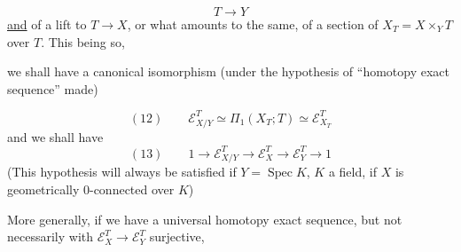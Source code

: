 
\[
T\longrightarrow Y
\]
\uline{and} of a lift to $T\longrightarrow X$, or what amounts to the same, of a section of $X_T=X\times_YT$ over $T$. This being so,

\noindent
\begin{minipage}[t]{0.48\linewidth}
\vspace*{\baselineskip}
\end{minipage}\hfill
\begin{minipage}[t]{0.48\linewidth}
we shall have a canonical isomorphism (under the hypothesis of ``homotopy exact sequence'' \deleted{\unsure{)}} made)
\end{minipage}

\[
(12)\qquad \mathcal E_{X/Y}^T\simeq\Pi_1(X_T;T)\simeq\mathcal E_{X_T}^T
\]
and we shall have
\[
(13)\qquad 1\longrightarrow\mathcal E_{X/Y}^T\longrightarrow\mathcal E_X^T\longrightarrow\mathcal E_Y^T\longrightarrow1
\]
(This hypothesis will always be satisfied if $Y=\operatorname{Spec}K$, $K$ a field, if $X$ is geometrically $0$-connected over $K$)

More generally, if we have a universal homotopy exact sequence, but not necessarily with $\mathcal E_X^T\longrightarrow\mathcal E_Y^T$ surjective,

